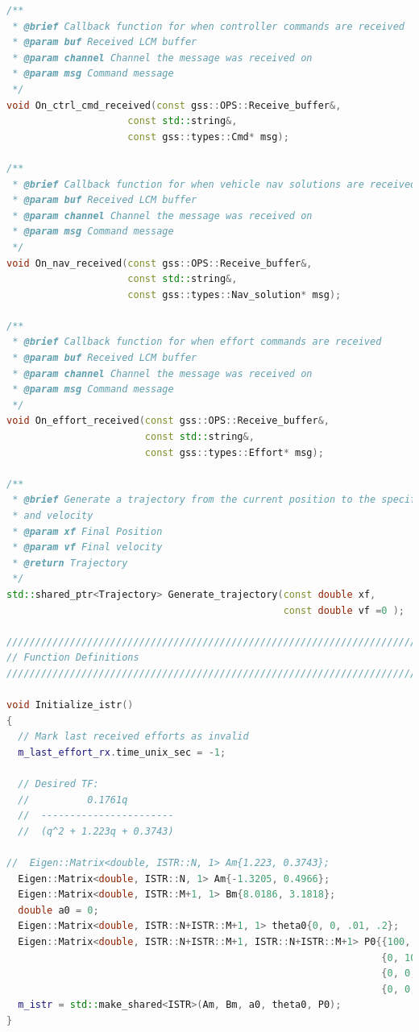 \documentclass[applsci,article,submit,pdftex,moreauthors]{Definitions/mdpi}
\begin{document}
\begin{lstlisting}[language=c++]
/**
 * @brief Callback function for when controller commands are received
 * @param buf Received LCM buffer
 * @param channel Channel the message was received on
 * @param msg Command message
 */
void On_ctrl_cmd_received(const gss::OPS::Receive_buffer&,
                     const std::string&,
                     const gss::types::Cmd* msg);

/**
 * @brief Callback function for when vehicle nav solutions are received
 * @param buf Received LCM buffer
 * @param channel Channel the message was received on
 * @param msg Command message
 */
void On_nav_received(const gss::OPS::Receive_buffer&,
                     const std::string&,
                     const gss::types::Nav_solution* msg);

/**
 * @brief Callback function for when effort commands are received
 * @param buf Received LCM buffer
 * @param channel Channel the message was received on
 * @param msg Command message
 */
void On_effort_received(const gss::OPS::Receive_buffer&,
                        const std::string&,
                        const gss::types::Effort* msg);

/**
 * @brief Generate a trajectory from the current position to the specified position
 * and velocity
 * @param xf Final Position
 * @param vf Final velocity
 * @return Trajectory
 */
std::shared_ptr<Trajectory> Generate_trajectory(const double xf,
                                                const double vf =0 );

///////////////////////////////////////////////////////////////////////
// Function Definitions
///////////////////////////////////////////////////////////////////////

void Initialize_istr()
{
  // Mark last received efforts as invalid
  m_last_effort_rx.time_unix_sec = -1;

  // Desired TF:
  //          0.1761q
  //  -----------------------
  //  (q^2 + 1.223q + 0.3743)

//  Eigen::Matrix<double, ISTR::N, 1> Am{1.223, 0.3743};
  Eigen::Matrix<double, ISTR::N, 1> Am{-1.3205, 0.4966};
  Eigen::Matrix<double, ISTR::M+1, 1> Bm{8.0186, 3.1818};
  double a0 = 0;
  Eigen::Matrix<double, ISTR::N+ISTR::M+1, 1> theta0{0, 0, .01, .2};
  Eigen::Matrix<double, ISTR::N+ISTR::M+1, ISTR::N+ISTR::M+1> P0{{100, 0, 0, 0},
                                                                 {0, 100, 0, 0},
                                                                 {0, 0,   1, 0},
                                                                 {0, 0,   0, 1}};
  m_istr = std::make_shared<ISTR>(Am, Bm, a0, theta0, P0);
}


\end{lstlisting}
\end{document}
